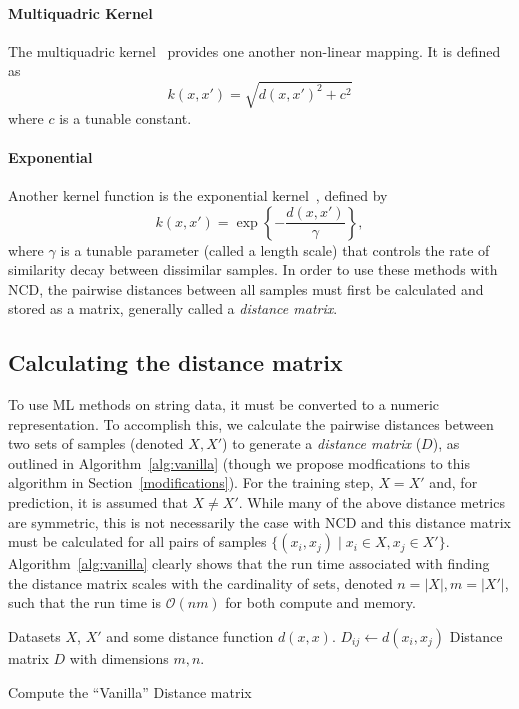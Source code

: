 \documentclass[preprint,12pt]{elsarticle}
\begin{document}
\paragraph{Multiquadric Kernel}
\label{multiquadric_kernel}
The multiquadric kernel~\cite{kernels} provides one another non-linear mapping.
It is defined as
$$
k(x, x') = \sqrt{d(x,x') ^2 + c^2}
$$
where $c$ is a tunable constant.


\paragraph{Exponential}
\label{exp_kernel}

Another kernel function is the exponential kernel~\cite{kernels}, defined by
$$
    k(x, x') = \exp\left\{-\frac{d(x,x')}{\gamma}\right\},
$$
where $\gamma$ is a tunable parameter (called a length scale) that controls the rate of similarity decay between dissimilar samples. In order to use these methods with NCD, the pairwise distances between all samples must first be calculated and stored as a matrix, generally called a \textit{distance matrix}.



\subsection{Calculating the distance matrix}
\label{distance_matrix}

To use ML methods on string data, it must be converted to a numeric representation.
To accomplish this, we calculate the pairwise distances between two sets of samples (denoted $X, X'$) to generate a \textit{distance matrix} ($D$), as outlined in Algorithm~\ref{alg:vanilla} (though we propose modfications to this algorithm in Section~\ref{modifications}).
For the training step, $X = X'$ and, for prediction, it is assumed that $X \neq X'$.
While many of the above distance metrics are symmetric, this is not necessarily the case with NCD and this distance matrix must be calculated for all pairs of samples $\{(x_i, x_j) \mid x_i \in X, x_j \in X'\}$.
Algorithm~\ref{alg:vanilla} clearly shows that the run time associated with finding the distance matrix scales with the cardinality of sets, denoted $n = | X |, m = | X' |$, such that the run time is $\mathcal{O}(nm)$ for both compute and memory.
\begin{algorithm}
    \begin{algorithmic}
        \Require Datasets $X$, $X'$ and some distance function $d(x,x)$.
                \State $D_{ij} \gets d(x_i, x_j)$
            \EndFor
        \EndFor
        \State \Return Distance matrix $D$ with dimensions $m,n$.
    \end{algorithmic}
    \caption{Compute the ``Vanilla'' Distance matrix}
    \label{alg:vanilla}
\end{algorithm}
\end{document}
